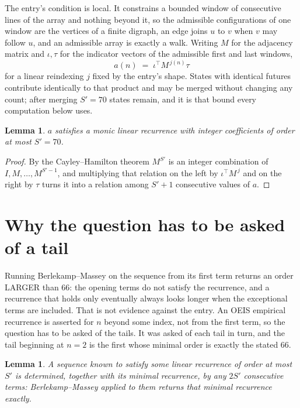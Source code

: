 \documentclass[11pt,a4paper]{article}
\theoremstyle{plain}
\newtheorem{lemma}[theorem]{Lemma}
\theoremstyle{definition}
\begin{document}
The entry's condition is local. It constrains a bounded window of consecutive lines of the
array and nothing beyond it, so the admissible configurations of one window are the vertices of
a finite digraph, an edge joins $u$ to $v$ when $v$ may follow $u$, and an admissible array is
exactly a walk. Writing $M$ for the adjacency matrix and $\iota,\tau$ for the indicator vectors
of the admissible first and last windows,
\[
a(n)\;=\;\iota^{\!\top}M^{\,j(n)}\tau
\]
for a linear reindexing $j$ fixed by the entry's shape. States with identical futures
contribute identically to that product and may be merged without changing any count; after
merging $S'=70$ states remain, and it is that bound every computation below uses.

\begin{lemma}\label{lem:cf}
$a$ satisfies a monic linear recurrence with integer coefficients of order at most $S'=70$.
\end{lemma}

\begin{proof}
By the Cayley--Hamilton theorem $M^{S'}$ is an integer combination of $I,M,\dots,M^{S'-1}$,
and multiplying that relation on the left by $\iota^{\!\top}M^{\,j}$ and on the right by
$\tau$ turns it into a relation among $S'+1$ consecutive values of $a$.
\end{proof}

\section{Why the question has to be asked of a tail}

Running Berlekamp--Massey on the sequence from its first term returns an order LARGER than $66$: the opening terms do not satisfy the recurrence, and a recurrence that holds only eventually always looks longer when the exceptional terms are included. That is not evidence against the entry. An OEIS empirical recurrence is asserted for $n$ beyond some index, not from the first term, so the question has to be asked of the tails. It was asked of each tail in turn, and the tail beginning at $n=2$ is the first whose minimal order is exactly the stated $66$.

\begin{lemma}\label{lem:bm}
A sequence known to satisfy some linear recurrence of order at most $S'$ is determined,
together with its minimal recurrence, by any $2S'$ consecutive terms: Berlekamp--Massey applied
to them returns that minimal recurrence exactly.
\end{lemma}
\end{document}
